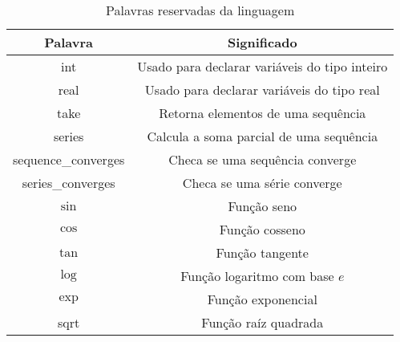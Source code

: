 \documentclass[a4 paper, 12pt]{article}
\begin{document}
\begin{table}[h]
\begin{center}
\begin{tabular}{|c|c|}
\hline
\textbf{Palavra}             & \textbf{Significado}                                                         \\ \hline
int                 & Usado para declarar vari\'aveis do tipo inteiro                     \\ \hline
real                & Usado para declarar vari\'aveis do tipo real                        \\ \hline
take                & Retorna elementos de uma sequ\^encia                \\ \hline
series              & Calcula a soma parcial de uma sequ\^encia           \\ \hline
sequence\_converges & Checa se uma sequ\^encia converge                   \\ \hline
series\_converges   & Checa se uma s\'erie converge                   \\ \hline
$\sin$              & Fun\c c\~ao seno                                                    \\ \hline
$\cos$              & Fun\c c\~ao cosseno                                                 \\ \hline
$\tan$              & Fun\c c\~ao tangente                                                \\ \hline
$\log$              & Fun\c c\~ao logaritmo com base $e$                                  \\ \hline
$\exp$              & Fun\c c\~ao exponencial                                             \\ \hline
sqrt                & Fun\c c\~ao ra\'iz quadrada                                         \\ \hline
\end{tabular}
\caption{Palavras reservadas da linguagem}
\label{tab1}
\end{center}
\end{table}
\end{document}
